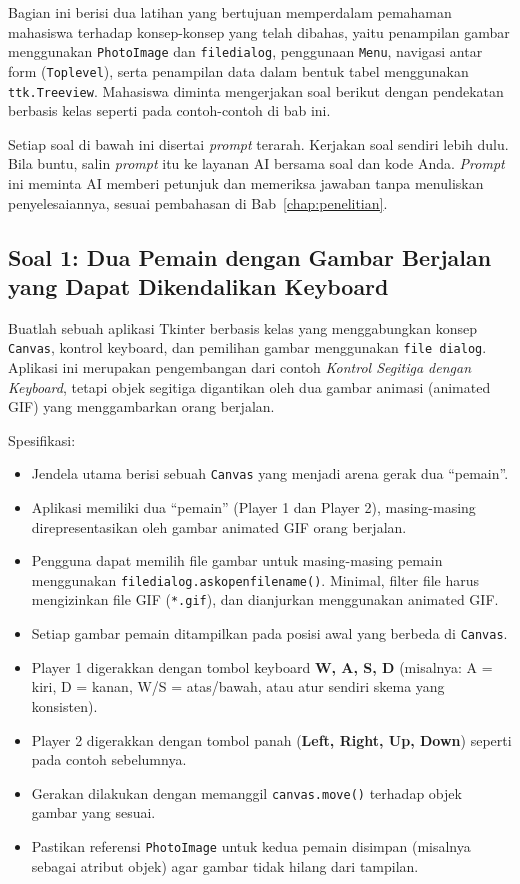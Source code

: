 Bagian ini berisi dua latihan yang bertujuan memperdalam pemahaman mahasiswa terhadap konsep-konsep yang telah dibahas, yaitu penampilan gambar menggunakan \texttt{PhotoImage} dan \texttt{filedialog}, penggunaan \texttt{Menu}, navigasi antar form (\texttt{Toplevel}), serta penampilan data dalam bentuk tabel menggunakan \texttt{ttk.Treeview}. Mahasiswa diminta mengerjakan soal berikut dengan pendekatan berbasis kelas seperti pada contoh-contoh di bab ini.

Setiap soal di bawah ini disertai \textit{prompt} terarah. Kerjakan soal sendiri lebih dulu. Bila buntu, salin \textit{prompt} itu ke layanan AI bersama soal dan kode Anda. \textit{Prompt} ini meminta AI memberi petunjuk dan memeriksa jawaban tanpa menuliskan penyelesaiannya, sesuai pembahasan di Bab~\ref{chap:penelitian}.

\subsection*{Soal 1: Dua Pemain dengan Gambar Berjalan yang Dapat Dikendalikan Keyboard}

Buatlah sebuah aplikasi Tkinter berbasis kelas yang menggabungkan konsep \texttt{Canvas}, kontrol keyboard, dan pemilihan gambar menggunakan \texttt{file dialog}. Aplikasi ini merupakan pengembangan dari contoh \emph{Kontrol Segitiga dengan Keyboard}, tetapi objek segitiga digantikan oleh dua gambar animasi (animated GIF) yang menggambarkan orang berjalan.

Spesifikasi:
\begin{itemize}
    \item Jendela utama berisi sebuah \texttt{Canvas} yang menjadi arena gerak dua ``pemain''.
    \item Aplikasi memiliki dua ``pemain'' (Player 1 dan Player 2), masing-masing direpresentasikan oleh gambar animated GIF orang berjalan.
    \item Pengguna dapat memilih file gambar untuk masing-masing pemain menggunakan \texttt{filedialog.askopenfilename()}. Minimal, filter file harus mengizinkan file GIF (\texttt{*.gif}), dan dianjurkan menggunakan animated GIF.
    \item Setiap gambar pemain ditampilkan pada posisi awal yang berbeda di \texttt{Canvas}.
    \item Player 1 digerakkan dengan tombol keyboard \textbf{W, A, S, D} (misalnya: A = kiri, D = kanan, W/S = atas/bawah, atau atur sendiri skema yang konsisten).
    \item Player 2 digerakkan dengan tombol panah (\textbf{Left, Right, Up, Down}) seperti pada contoh sebelumnya.
    \item Gerakan dilakukan dengan memanggil \texttt{canvas.move()} terhadap objek gambar yang sesuai.
    \item Pastikan referensi \texttt{PhotoImage} untuk kedua pemain disimpan (misalnya sebagai atribut objek) agar gambar tidak hilang dari tampilan.
\end{itemize}

